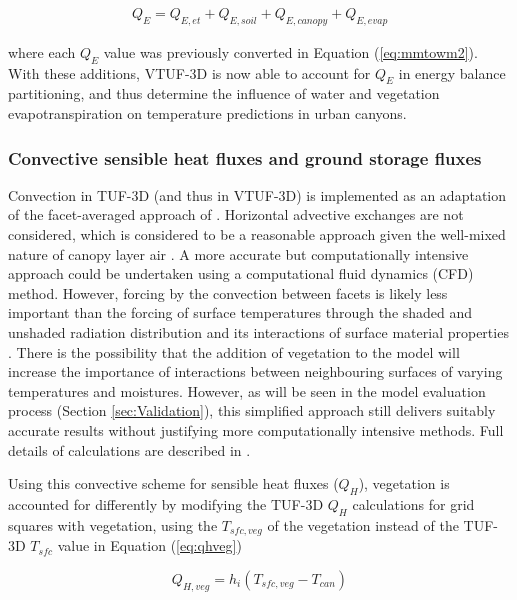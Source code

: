 \documentclass[final,3p,times,authoryear]{elsarticle}
\begin{document}
\begin{equation}\label{eq:lefromet} 
\begin{aligned}
Q_{E} = Q_{E,et} + Q_{E,soil} + Q_{E,canopy} + Q_{E,evap} 
\end{aligned}
\end{equation}

where each $Q_{E}$ value was previously converted in Equation (\ref{eq:mmtowm2}). With these additions, VTUF-3D is now able to account for $Q_{E}$ in energy balance partitioning, and thus determine the influence of water and vegetation evapotranspiration on temperature predictions in urban canyons.


\subsubsection{Convective sensible heat fluxes and ground storage fluxes}\label{sec:convection} 
Convection in TUF-3D (and thus in VTUF-3D) is implemented as an adaptation of the facet-averaged approach of \cite{Masson2000}. Horizontal advective exchanges are not considered, which is considered to be a reasonable approach given the well-mixed nature of canopy layer air \citep{Krayenhoff2007}. A more accurate but computationally intensive approach could be undertaken using a computational fluid dynamics (CFD) method. However, forcing by the convection between facets is likely less important than the forcing of surface temperatures through the shaded and unshaded radiation distribution and its interactions of surface material properties \citep{Krayenhoff2007}. There is the possibility that the addition of vegetation to the model will increase the importance of interactions between neighbouring surfaces of varying temperatures and moistures. However, as will be seen in the model evaluation process (Section \ref{sec:Validation}), this simplified approach still delivers suitably accurate results without justifying more computationally intensive methods. Full details of calculations are described in \cite{Krayenhoff2007}.

Using this convective scheme for sensible heat fluxes ($Q_{H}$), vegetation is accounted for differently by modifying the TUF-3D $Q_{H}$ calculations for grid squares with vegetation, using the $T_{sfc,veg}$ of the vegetation instead of the TUF-3D $T_{sfc}$ value in Equation (\ref{eq:qhveg})

\begin{equation}\label{eq:qhveg}
 Q_{H,veg} = h_{i}  (T_{sfc,veg}-T_{can}) 
\end{equation}
\end{document}
